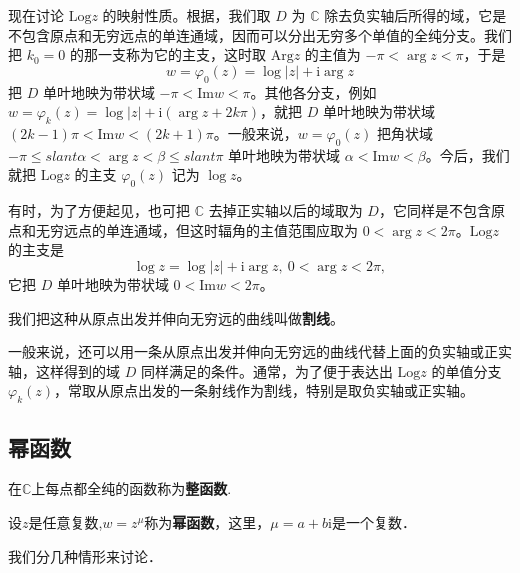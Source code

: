 \documentclass[../../main.tex]{subfiles}
\begin{document}
现在讨论 \( \mathrm{Log} z \) 的映射性质。根据，我们取 \( D \) 为 \( \mathbb{C} \) 除去负实轴后所得的域，它是不包含原点和无穷远点的单连通域，因而可以分出无穷多个单值的全纯分支。我们把 \( k_0 = 0 \) 的那一支称为它的主支，这时取 \( \mathrm{Arg} z \) 的主值为 \( -\pi < \arg z < \pi \)，于是
\[
w = \varphi_0(z) = \log|z| + \mathrm{i}\arg z
\]
把 \( D \) 单叶地映为带状域 \( -\pi < \mathrm{Im} w < \pi \)。其他各分支，例如 \( w = \varphi_k(z)=\log|z| + \mathrm{i}(\arg z + 2k\pi) \)，就把 \( D \) 单叶地映为带状域 \( (2k - 1)\pi < \mathrm{Im} w < (2k + 1)\pi \)。一般来说，\( w = \varphi_0(z) \) 把角状域 \( -\pi \leqslant slant \alpha < \arg z < \beta \leqslant slant \pi \) 单叶地映为带状域 \( \alpha < \mathrm{Im} w < \beta \)。今后，我们就把 \( \mathrm{Log} z \) 的主支 \( \varphi_0(z) \) 记为 \( \log z \)。

有时，为了方便起见，也可把 \( \mathbb{C} \) 去掉正实轴以后的域取为 \( D \)，它同样是不包含原点和无穷远点的单连通域，但这时辐角的主值范围应取为 \( 0 < \arg z < 2\pi \)。\( \mathrm{Log} z \) 的主支是
\[
\log z = \log|z| + \mathrm{i}\arg z, \ 0 < \arg z < 2\pi,
\]
它把 \( D \) 单叶地映为带状域 \( 0 < \mathrm{Im} w < 2\pi \)。

\begin{definition}[割线]
我们把这种从原点出发并伸向无穷远的曲线叫做\textbf{割线}。
\end{definition}

一般来说，还可以用一条从原点出发并伸向无穷远的曲线代替上面的负实轴或正实轴，这样得到的域 \( D \) 同样满足的条件。通常，为了便于表达出 \( \mathrm{Log} z \) 的单值分支 \( \varphi_k(z) \)，常取从原点出发的一条射线作为割线，特别是取负实轴或正实轴。



\subsection{幂函数}

\begin{definition}[整函数]
在$\mathbb{C}$上每点都全纯的函数称为\textbf{整函数}.
\end{definition}

\begin{definition}[幂函数]
设$z$是任意复数,$w = z^{\mu}$称为\textbf{幂函数}，这里，$\mu = a + b\text{i}$是一个复数．
\end{definition}
我们分几种情形来讨论．
\end{document}
